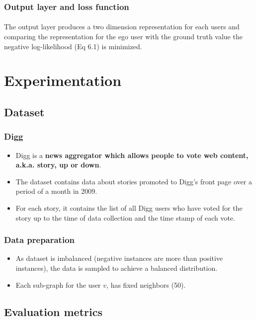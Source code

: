 \subsubsection{Output layer and loss function}

\paragraph{} The output layer produces a two dimension representation for each users and comparing the representation for
the ego user with the ground truth value the negative log-likelihood (Eq 6.1) is minimized.

\section{Experimentation}

\subsection{Dataset}

\subsubsection{Digg}
\begin{itemize}
    \item Digg is a \textbf{news aggregator which allows people to vote web content, a.k.a. story, up or down}.
    \item The dataset contains data about stories promoted to Digg’s front page over a period of a month in 2009.
    \item For each story, it contains the list of all Digg users who have voted for the story up to the 
    time of data collection and the time stamp of each vote.
\end{itemize}

\subsubsection{Data preparation}
\begin{itemize}
    \item As dataset is imbalanced (negative instances are more than positive instances), the data is sampled to achieve a balanced distribution.
    \item Each sub-graph for the user $v$, has fixed neighbors (50).
\end{itemize}

\subsection{Evaluation metrics}
